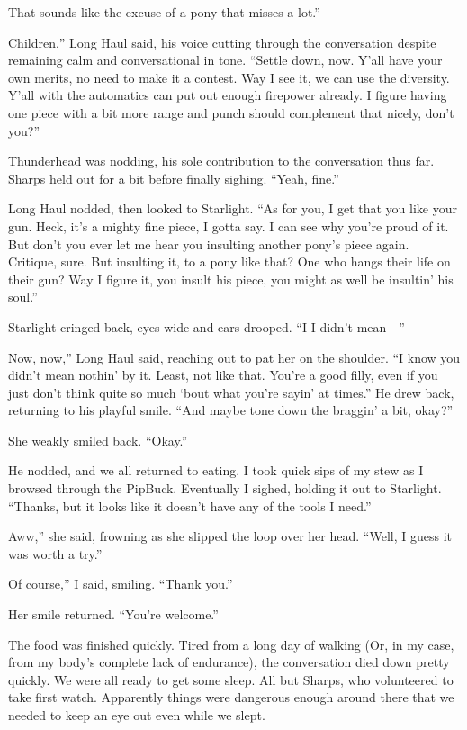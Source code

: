 \leavevmode{}That sounds like the excuse of a pony that misses a lot.”

\leavevmode{}Children,” Long Haul said, his voice cutting through the conversation despite remaining calm and conversational in tone. “Settle down, now. Y’all have your own merits, no need to make it a contest. Way I see it, we can use the diversity. Y’all with the automatics can put out enough firepower already. I figure having one piece with a bit more range and punch should complement that nicely, don’t you?”

Thunderhead was nodding, his sole contribution to the conversation thus far. Sharps held out for a bit before finally sighing. “Yeah, fine.”

Long Haul nodded, then looked to Starlight. “As for you, I get that you like your gun. Heck, it’s a mighty fine piece, I gotta say. I can see why you’re proud of it. But don’t you ever let me hear you insulting another pony’s piece again. Critique, sure. But insulting it, to a pony like that? One who hangs their life on their gun? Way I figure it, you insult his piece, you might as well be insultin’ his soul.”

Starlight cringed back, eyes wide and ears drooped. “I-I didn’t mean—”

\leavevmode{}Now, now,” Long Haul said, reaching out to pat her on the shoulder. “I know you didn’t mean nothin’ by it. Least, not like that. You’re a good filly, even if you just don’t think quite so much ‘bout what you’re sayin’ at times.” He drew back, returning to his playful smile. “And maybe tone down the braggin’ a bit, okay?”

She weakly smiled back. “Okay.”

He nodded, and we all returned to eating. I took quick sips of my stew as I browsed through the PipBuck. Eventually I sighed, holding it out to Starlight. “Thanks, but it looks like it doesn’t have any of the tools I need.”

\leavevmode{}Aww,” she said, frowning as she slipped the loop over her head. “Well, I guess it was worth a try.”

\leavevmode{}Of course,” I said, smiling. “Thank you.”

Her smile returned. “You’re welcome.”

The food was finished quickly. Tired from a long day of walking (Or, in my case, from my body’s complete lack of endurance), the conversation died down pretty quickly. We were all ready to get some sleep. All but Sharps, who volunteered to take first watch. Apparently things were dangerous enough around there that we needed to keep an eye out even while we slept.

